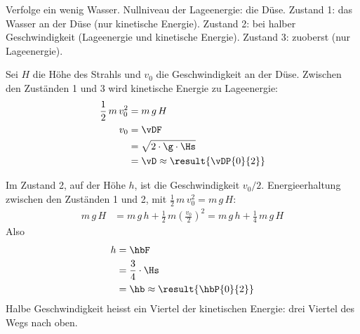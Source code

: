 Verfolge ein wenig Wasser. Nullniveau der Lageenergie: die Düse. Zustand 1: das Wasser an der Düse (nur kinetische Energie). Zustand 2: bei halber Geschwindigkeit (Lageenergie und kinetische Energie). Zustand 3: zuoberst (nur Lageenergie).

\begin{abcliste}
\abc
Sei $H$ die Höhe des Strahls und $v_0$ die Geschwindigkeit an der Düse. Zwischen den Zuständen 1 und 3 wird kinetische Energie zu Lageenergie:
\begin{align}
 \frac{1}{2}\,m\,v_0^2 &= m\,g\,H \\
 v_0 &= \vDF \\
   &= \sqrt{2\cdot\g\cdot\Hs} \\
   &= \vD \approx \result{\vDP{0}{2}}
\end{align}

\abc
Im Zustand 2, auf der Höhe $h$, ist die Geschwindigkeit $v_0/2$. Energieerhaltung zwischen den Zuständen 1 und 2, mit $\frac{1}{2}\,m\,v_0^2 = m\,g\,H$:
\begin{align}
 m\,g\,H &= m\,g\,h + \frac{1}{2}\,m\left(\frac{v_0}{2}\right)^2 = m\,g\,h + \frac{1}{4}\,m\,g\,H
\end{align}
Also
\begin{align}
 h &= \hbF \\
   &= \frac{3}{4}\cdot\Hs \\
   &= \hb \approx \result{\hbP{0}{2}}
\end{align}
Halbe Geschwindigkeit heisst ein Viertel der kinetischen Energie: drei Viertel des Wegs nach oben.
\end{abcliste}
